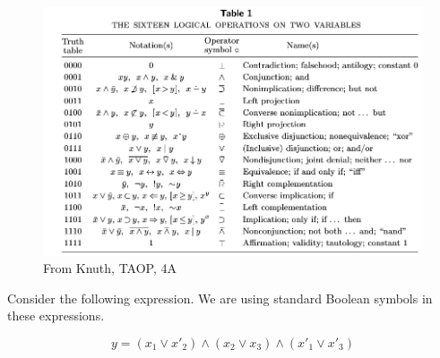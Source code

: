     \begin{figure}[h]
      \includegraphics[width=\textwidth]{./figs/symbols.png}
      \caption{\small From Knuth, TAOP, 4A}
      \label{table:symbols}
    \end{figure}
    
    Consider the following expression. We are using standard Boolean symbols in these
    expressions.

    \begin{equation}
    \label{eq:expr1}
    y = (x_1 \vee x'_2) \wedge (x_2 \vee x_3) \wedge (x'_1 \vee x'_3)
    \end{equation}

